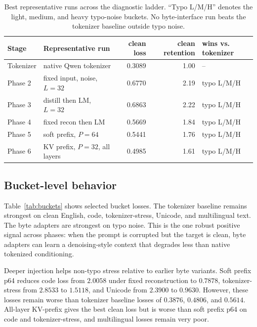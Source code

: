 \documentclass{article}
\begin{document}
\begin{table}[t]
\centering
\small
\begin{tabular}{llrrl}
\toprule
Stage & Representative run & clean loss & clean retention & wins vs. tokenizer \\
\midrule
Tokenizer & native Qwen tokenizer & 0.3089 & 1.00 & -- \\
Phase 2 & fixed input, noise, $L=32$ & 0.6770 & 2.19 & typo L/M/H \\
Phase 3 & distill then LM, $L=32$ & 0.6863 & 2.22 & typo L/M/H \\
Phase 4 & fixed recon then LM & 0.5669 & 1.84 & typo L/M/H \\
Phase 5 & soft prefix, $P=64$ & 0.5441 & 1.76 & typo L/M/H \\
Phase 6 & KV prefix, $P=32$, all layers & 0.4985 & 1.61 & typo L/M/H \\
\bottomrule
\end{tabular}
\caption{Best representative runs across the diagnostic ladder. ``Typo L/M/H'' denotes the light, medium, and heavy typo-noise buckets. No byte-interface run beats the tokenizer baseline outside typo noise.}
\label{tab:main}
\end{table}

\subsection{Bucket-level behavior}

Table~\ref{tab:buckets} shows selected bucket losses. The tokenizer baseline remains strongest on clean English, code, tokenizer-stress, Unicode, and multilingual text. The byte adapters are strongest on typo noise. This is the one robust positive signal across phases: when the prompt is corrupted but the target is clean, byte adapters can learn a denoising-style context that degrades less than native tokenized conditioning.

Deeper injection helps non-typo stress relative to earlier byte variants. Soft prefix p64 reduces code loss from $2.0058$ under fixed reconstruction to $0.7878$, tokenizer-stress from $2.8533$ to $1.5118$, and Unicode from $2.3900$ to $0.9630$. However, these losses remain worse than tokenizer baseline losses of $0.3876$, $0.4806$, and $0.5614$. All-layer KV-prefix gives the best clean loss but is worse than soft prefix p64 on code and tokenizer-stress, and multilingual losses remain very poor.
\end{document}
